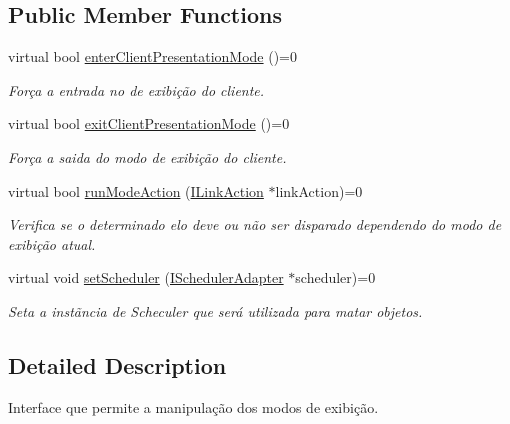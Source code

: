 \subsection*{Public Member Functions}
\begin{DoxyCompactItemize}
\item 
virtual bool \hyperlink{classbr_1_1ufscar_1_1lince_1_1ginga_1_1wac_1_1editing_1_1IMode_ab6b8c4de92a5f940f8c726f327f9aa55}{enterClientPresentationMode} ()=0
\begin{DoxyCompactList}\small\item\em Força a entrada no de exibição do cliente. \item\end{DoxyCompactList}\item 
virtual bool \hyperlink{classbr_1_1ufscar_1_1lince_1_1ginga_1_1wac_1_1editing_1_1IMode_a36555fd659519e30880b9d3f4644d257}{exitClientPresentationMode} ()=0
\begin{DoxyCompactList}\small\item\em Força a saida do modo de exibição do cliente. \item\end{DoxyCompactList}\item 
virtual bool \hyperlink{classbr_1_1ufscar_1_1lince_1_1ginga_1_1wac_1_1editing_1_1IMode_a5c0f479717a32e10c4810abdfe4e03d4}{runModeAction} (\hyperlink{classbr_1_1ufscar_1_1lince_1_1ginga_1_1wac_1_1editing_1_1ILinkAction}{ILinkAction} $\ast$linkAction)=0
\begin{DoxyCompactList}\small\item\em Verifica se o determinado elo deve ou não ser disparado dependendo do modo de exibição atual. \item\end{DoxyCompactList}\item 
virtual void \hyperlink{classbr_1_1ufscar_1_1lince_1_1ginga_1_1wac_1_1editing_1_1IMode_a5048bc35fa6ade1b514f79467519b52f}{setScheduler} (\hyperlink{classbr_1_1ufscar_1_1lince_1_1ginga_1_1wac_1_1editing_1_1ISchedulerAdapter}{ISchedulerAdapter} $\ast$scheduler)=0
\begin{DoxyCompactList}\small\item\em Seta a instãncia de Scheculer que será utilizada para matar objetos. \item\end{DoxyCompactList}\end{DoxyCompactItemize}


\subsection{Detailed Description}
Interface que permite a manipulação dos modos de exibição. 

